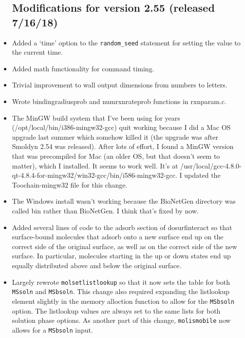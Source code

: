 \documentclass {scrbook}
\newcommand {\ttt} {\texttt}
\begin{document}
\begin{itemize}
\subsection{Modifications for version 2.55 (released 7/16/18)}
\item Added a `time' option to the \ttt{random\_seed} statement for setting the value to the current time.
\item Added math functionality for command timing.
\item Trivial improvement to wall output dimensions from numbers to letters.
\item Wrote bindingradiusprob and numrxnrateprob functions in rxnparam.c.
\item The MinGW build system that I've been using for years (/opt/local/bin/i386-mingw32-gcc) quit working because I did a Mac OS upgrade last summer which somehow killed it (the upgrade was after Smoldyn 2.54 was released). After lots of effort, I found a MinGW version that was precompiled for Mac (an older OS, but that doesn't seem to matter), which I installed. It seems to work well. It's at /usr/local/gcc-4.8.0-qt-4.8.4-for-mingw32/win32-gcc/bin/i586-mingw32-gcc. I updated the Toochain-mingw32 file for this change.
\item The Windows install wasn't working because the BioNetGen directory was called bin rather than BioNetGen. I think that's fixed by now.
\item Added several lines of code to the adsorb section of dosurfinteract so that surface-bound molecules that adsorb onto a new surface end up on the correct side of the original surface, as well as on the correct side of the new surface. In particular, molecules starting in the up or down states end up equally distributed above and below the original surface.
\item Largely rewrote \ttt{molsetlistlookup} so that it now sets the table for both \ttt{MSsoln} and \ttt{MSbsoln}. This change also required expanding the listlookup element slightly in the memory alloction function to allow for the \ttt{MSbsoln} option. The listlookup values are always set to the same lists for both solution phase options. As another part of this change, \ttt{molismobile} now allows for a \ttt{MSbsoln} input.


\end{itemize}
\end{document}
